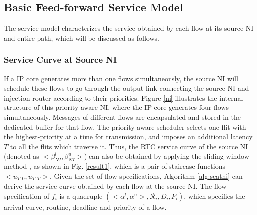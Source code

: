 \documentclass[preprint]{elsarticle}
\begin{document}
\subsection{Basic Feed-forward Service Model}\label{sm}
The service model characterizes the service obtained by each flow at its source NI and entire path, which will be discussed as follows.

\subsubsection{Service Curve at Source NI}
If a IP core generates more than one flows simultaneously, the source NI will schedule these flows to go through the output link connecting the source NI and injection router according to their priorities. Figure \ref{ni} illustrates the internal structure of this priority-aware NI, where the IP core generates four flows simultaneously. Messages of different flows are encapsulated and stored in the dedicated buffer for that flow. The priority-aware scheduler selects one flit with the highest-priority at a time for transmission, and imposes an additional latency $T$ to all the flits which traverse it. Thus, the RTC service curve of the source NI (denoted as $<\beta^l_{NI},\beta^u_{NI}>$) can also be obtained by applying the sliding window method \cite{1253607}, as shown in Fig. \ref{result1}, which is a pair of staircase functions $<u_{T,0},u_{T,T}>$. Given the set of flow specifications, Algorithm \ref{alg:scatni} can derive the service curve obtained by each flow at the source NI. The flow specification of $f_i$ is a quadruple $(<\alpha^l,\alpha^u>,\mathcal{R}_i,D_i,P_i)$, which specifies the arrival curve, routine, deadline and priority of a flow.
\end{document}
